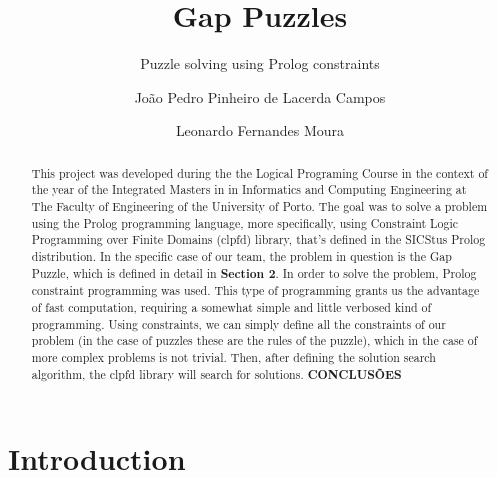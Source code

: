 \documentclass[runningheads]{llncs}
\begin{document}
%
\title{Gap Puzzles}

\subtitle{Puzzle solving using Prolog constraints}
%
%
\author{João Pedro Pinheiro de Lacerda Campos \and
Leonardo Fernandes Moura}
%
%


%
\maketitle              %
%
\begin{abstract}
This project was developed during the the Logical Programing Course in the context of the year
of the Integrated Masters in in Informatics and Computing Engineering at The Faculty of Engineering
of the University of Porto. The goal was to solve a problem using the Prolog programming language,
more specifically, using Constraint Logic Programming over Finite Domains (clpfd) library, that's defined
in the SICStus Prolog distribution. 
In the specific case of our team, the problem in question is the Gap Puzzle, which is defined in detail in
\textbf{Section 2}.
In order to solve the problem, Prolog constraint programming was used. This type of programming grants us the
advantage of fast computation, requiring a somewhat simple and little verbosed kind of programming. Using constraints,
we can simply define all the constraints of our problem (in the case of puzzles these are the rules of the puzzle), 
which in the case of more complex problems is not trivial. Then, after defining the solution search algorithm, 
the clpfd library will search for solutions.
\textbf{CONCLUSÕES}
    

\end{abstract}

\pagebreak

\section{Introduction}
\end{document}

